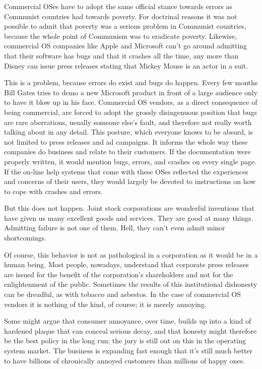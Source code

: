 \documentclass[
  fontsize=11pt,
  paper=landscape,
  twocolumn=true,
  pagesize=pdftex,
  headings=small,
  DIV=15,
  ]{scrartcl}
\begin{document}
Commercial OSes have to adopt the same official stance towards errors as
Communist countries had towards poverty. For doctrinal reasons it was
not possible to admit that poverty was a serious problem in Communist
countries, because the whole point of Communism was to eradicate
poverty. Likewise, commercial OS companies like Apple and Microsoft
can't go around admitting that their software has bugs and that it
crashes all the time, any more than Disney can issue press releases
stating that Mickey Mouse is an actor in a suit.

This is a problem, because errors do exist and bugs do happen. Every few
months Bill Gates tries to demo a new Microsoft product in front of a
large audience only to have it blow up in his face. Commercial OS
vendors, as a direct consequence of being commercial, are forced to
adopt the grossly disingenuous position that bugs are rare aberrations,
usually someone else's fault, and therefore not really worth talking
about in any detail. This posture, which everyone knows to be absurd, is
not limited to press releases and ad campaigns. It informs the whole way
these companies do business and relate to their customers. If the
documentation were properly written, it would mention bugs, errors, and
crashes on every single page. If the on-line help systems that come with
these OSes reflected the experiences and concerns of their users, they
would largely be devoted to instructions on how to cope with crashes and
errors.

But this does not happen. Joint stock corporations are wonderful
inventions that have given us many excellent goods and services. They
are good at many things. Admitting failure is not one of them. Hell,
they can't even admit minor shortcomings.

Of course, this behavior is not as pathological in a corporation as it
would be in a human being. Most people, nowadays, understand that
corporate press releases are issued for the benefit of the corporation's
shareholders and not for the enlightenment of the public. Sometimes the
results of this institutional dishonesty can be dreadful, as with
tobacco and asbestos. In the case of commercial OS vendors it is nothing
of the kind, of course; it is merely annoying.

Some might argue that consumer annoyance, over time, builds up into a
kind of hardened plaque that can conceal serious decay, and that honesty
might therefore be the best policy in the long run; the jury is still
out on this in the operating system market. The business is expanding
fast enough that it's still much better to have billions of chronically
annoyed customers than millions of happy ones.
\end{document}
